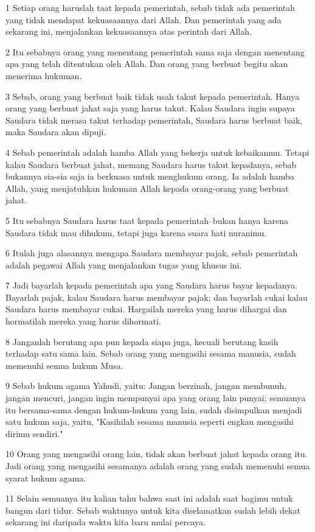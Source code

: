 \par 1 Setiap orang haruslah taat kepada pemerintah, sebab tidak ada pemerintah yang tidak mendapat kekuasaannya dari Allah. Dan pemerintah yang ada sekarang ini, menjalankan kekuasaannya atas perintah dari Allah.
\par 2 Itu sebabnya orang yang menentang pemerintah sama saja dengan menentang apa yang telah ditentukan oleh Allah. Dan orang yang berbuat begitu akan menerima hukuman.
\par 3 Sebab, orang yang berbuat baik tidak usah takut kepada pemerintah. Hanya orang yang berbuat jahat saja yang harus takut. Kalau Saudara ingin supaya Saudara tidak merasa takut terhadap pemerintah, Saudara harus berbuat baik, maka Saudara akan dipuji.
\par 4 Sebab pemerintah adalah hamba Allah yang bekerja untuk kebaikanmu. Tetapi kalau Saudara berbuat jahat, memang Saudara harus takut kepadanya, sebab bukannya sia-sia saja ia berkuasa untuk menghukum orang. Ia adalah hamba Allah, yang menjatuhkan hukuman Allah kepada orang-orang yang berbuat jahat.
\par 5 Itu sebabnya Saudara harus taat kepada pemerintah--bukan hanya karena Saudara tidak mau dihukum, tetapi juga karena suara hati nuranimu.
\par 6 Itulah juga alasannya mengapa Saudara membayar pajak, sebab pemerintah adalah pegawai Allah yang menjalankan tugas yang khusus ini.
\par 7 Jadi bayarlah kepada pemerintah apa yang Saudara harus bayar kepadanya. Bayarlah pajak, kalau Saudara harus membayar pajak; dan bayarlah cukai kalau Saudara harus membayar cukai. Hargailah mereka yang harus dihargai dan hormatilah mereka yang harus dihormati.
\par 8 Janganlah berutang apa pun kepada siapa juga, kecuali berutang kasih terhadap satu sama lain. Sebab orang yang mengasihi sesama manusia, sudah memenuhi semua hukum Musa.
\par 9 Sebab hukum agama Yahudi, yaitu: Jangan berzinah, jangan membunuh, jangan mencuri, jangan ingin mempunyai apa yang orang lain punyai; semuanya itu bersama-sama dengan hukum-hukum yang lain, sudah disimpulkan menjadi satu hukum saja, yaitu, "Kasihilah sesama manusia seperti engkau mengasihi dirimu sendiri."
\par 10 Orang yang mengasihi orang lain, tidak akan berbuat jahat kepada orang itu. Jadi orang yang mengasihi sesamanya adalah orang yang sudah memenuhi semua syarat hukum agama.
\par 11 Selain semuanya itu kalian tahu bahwa saat ini adalah saat bagimu untuk bangun dari tidur. Sebab waktunya untuk kita diselamatkan sudah lebih dekat sekarang ini daripada waktu kita baru mulai percaya.
